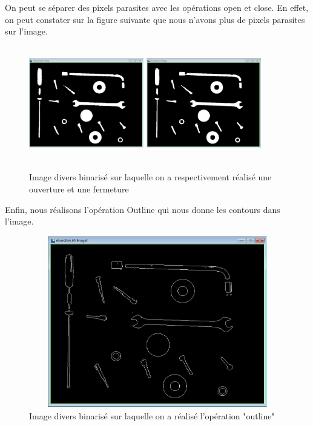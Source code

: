 \documentclass{scrreprt}
\begin{document}
\newpage
On peut se séparer des pixels parasites avec les opérations open et close. 
En effet, on peut constater sur la figure suivante que nous n'avons plus de pixels parasites sur
l'image. 

\begin{figure}[!h]
\centering
\includegraphics[height=5cm,width=5cm]{images/open.png} \hfill
\includegraphics[height=5cm,width=5cm]{images/close.png}
\caption{Image divers binarisé sur laquelle on a respectivement réalisé une ouverture et une fermeture}
\end{figure}

Enfin, nous réalisons l'opération Outline qui nous donne les contours dans l'image. 

\begin{figure}[!h]
\centering
\includegraphics[height=7.5cm,width=15cm]{images/outline.png}
\caption{Image divers binarisé sur laquelle on a réalisé l'opération "outline"}
\end{figure}
\end{document}
